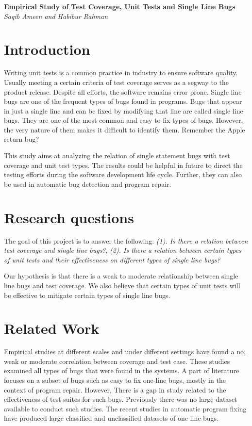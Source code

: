 \documentclass[11pt]{article}
\begin{document}
\begin{center}
{\bf \Large Empirical Study of Test Coverage, Unit Tests and Single Line Bugs}\\
\vspace{.1in}
{\em Saqib Ameen and Habibur Rahman}
\end{center}


\section{Introduction}

Writing unit tests is a common practice in industry to ensure software quality. Usually meeting a certain criteria of test coverage serves as a segway to the product release. Despite all efforts, the software remains error prone. Single line bugs are one of the frequent types of bugs found in programs. Bugs that appear in just a single line and can be fixed by modifying that line are called single line bugs. They are one of the most common and easy to fix types of bugs. However, the very nature of them makes it difficult to identify them. Remember the Apple return bug? 

This study aims at analyzing the relation of single statement bugs with test coverage and unit test types. The results could be helpful in future to direct the testing efforts during the software development life cycle. Further, they can also be used in automatic bug detection and program repair.
\section{Research questions}

The goal of this project is to answer the following:
\textit{(1). Is there a relation between test coverage and single line bugs?}, \textit{(2). Is there a relation between certain types of unit tests and their effectiveness on different types of single line bugs?}

Our hypothesis is that there is a weak to moderate relationship between single line bugs and test coverage. We also believe that certain types of unit tests will be effective to mitigate certain types of single line bugs.

\section{Related Work}
Empirical studies \cite{gren2017relation, antinyan2018mythical, inozemtseva2014coverage} at different scales and under different settings have found a no, weak or moderate correlation between coverage and test case. These studies examined all types of bugs that were found in the systems. A part of literature focuses on a subset of bugs such as easy to fix one-line bugs, mostly in the context of program repair. However, There is a gap in study related to the effectiveness of test suites for such bugs. Previously there was no large dataset available to conduct such studies. The recent studies in automatic program fixing have produced large classified \cite{karampatsis2020often} and unclassified \cite{chen2019sequencer} datasets of one-line bugs.  
\end{document}
